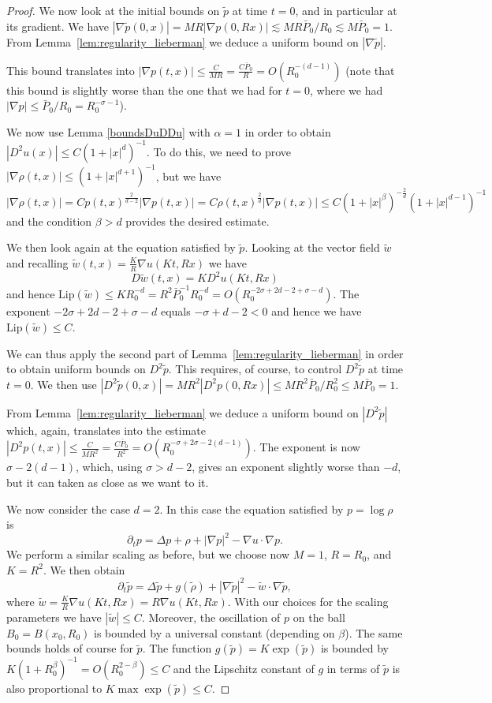 \documentclass[11pt,a4paper]{article}
\numberwithin{equation}{section}
\theoremstyle{plain}
\theoremstyle{remark}
\newcommand{\Lip}{\mathrm{Lip}}
\begin{document}
\begin{proof}
We now look at the initial bounds on $\tilde p$ at time $t=0$, and in particular at its gradient. We have $|\nabla\tilde p(0,x)|=MR|\nabla p(0,Rx)|\lesssim MR\bar P_0/R_0\lesssim M\bar P_0=1$. From Lemma~\ref{lem:regularity_lieberman}  we deduce a uniform bound on $|\nabla \tilde p|$.

This bound translates into $|\nabla p(t,x)|\leq \frac{C}{MR}=\frac{C\bar P_0}{R}=O(R_0^{-(d-1)})$ (note that this bound is slightly worse than the one that we had for $t=0$, where we had $|\nabla p|\leq \bar P_0/R_0=R_0^{-\sigma-1}$). 

We now use Lemma \ref{boundsDuDDu} with $\alpha=1$ in order to obtain $|D^2u(x)|\leq C(1+|x|^d)^{-1}$. To do this, we need to prove $|\nabla \rho(t,x)|\leq (1+|x|^{d+1})^{-1}$, but we have
$$|\nabla \rho(t,x)|=Cp(t,x)^{\frac{2}{d-2}}|\nabla p(t,x)|=C\rho(t,x)^{\frac 2d}|\nabla p(t,x)|\leq C(1+|x|^\beta)^{-\frac 2d}(1+|x|^{d-1})^{-1}$$
and the condition $\beta>d$ provides the desired estimate. 

We then look again at the equation satisfied by $\tilde p$. Looking at the vector field $\tilde w$ and recalling 
$\tilde w(t,x)=\frac KR\nabla u(Kt,Rx)$ we have 
$$D\tilde w(t,x)=K D^2u(Kt,Rx)$$
and hence $\Lip(\tilde w)\leq K R_0^{-d}=R^2\bar P_0^{-1}R_0^{-d}=O(R_0^{-2\sigma+2d-2+\sigma-d}).$ The exponent $-2\sigma+2d-2+\sigma-d$ equals $-\sigma+d-2<0$ and hence we have $\Lip(\tilde w)\leq C$.

We can thus apply the second part of Lemma~\ref{lem:regularity_lieberman}  in order to obtain uniform bounds on $D^2\tilde p$. This requires, of course, to control $D^2\tilde p$ at time $t=0$. We then use $|D^2\tilde p(0,x)|=MR^2|D^2 p(0,Rx)|\leq MR^2\bar P_0/R_0^2\leq M\bar P_0=1$.

From Lemma~\ref{lem:regularity_lieberman} we deduce a uniform bound on $|D^2 \tilde p|$ which, again, translates into the estimate $|D^2 p(t,x)|\leq \frac{C}{MR^2}=\frac{C\bar P_0}{R^2}=O(R_0^{-\sigma+2\sigma-2(d-1)})$. The exponent is now $\sigma-2(d-1)$, which, using $\sigma>d-2$, gives an exponent slightly worse than $-d$, but it can taken as close as we want to it. 

We now consider the case $d=2$. In this case the equation satisfied by $p=\log \rho$ is 
$$
    \partial_t p =\Delta p+\rho+|\nabla p|^2-\nabla u\cdot \nabla p.
$$
We perform a similar scaling as before, but we choose now $M=1$, $R=R_0$, and $K=R^2$.
We then obtain
$$\partial_t\tilde p =\Delta\tilde p+g(\tilde\rho)+|\nabla\tilde p|^2-\tilde w\cdot \nabla \tilde p, $$
where $\tilde w=\frac KR \nabla u(Kt,Rx)=R\nabla u(Kt,Rx)$.
With our choices for the scaling parameters we have $|\tilde w|\leq C$. Moreover, the oscillation of $p$ on the ball $B_0=B(x_0,R_0)$ is bounded by a universal constant (depending on $\beta$). The same bounds holds of course for $\tilde p$.
The function $g(\tilde p)=K\exp(\tilde p)$ is bounded by $K(1+R_0^{\beta})^{-1}=O(R_0^{2-\beta})\leq C$ and the Lipschitz constant of $g$ in terms of $\tilde p$ is also proportional to $K\max \exp(\tilde p)\leq C$.


\end{proof}
\end{document}
